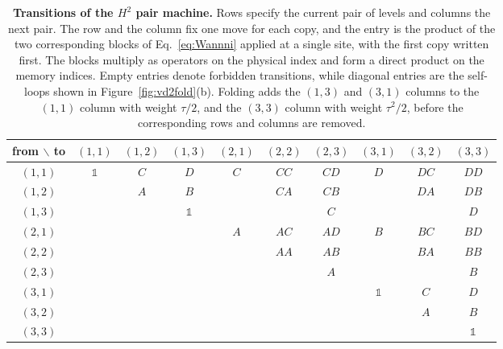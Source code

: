 \begin{table}[!htb]
  \centering
  \footnotesize
  \begin{tabular}{c|ccccccccc}
    \hline
    from $\backslash$ to & $(1,1)$      & $(1,2)$ & $(1,3)$      & $(2,1)$ & $(2,2)$ & $(2,3)$ & $(3,1)$      & $(3,2)$ & $(3,3)$      \\
    \hline
    $(1,1)$              & $\mathbb{1}$ & $C$     & $D$          & $C$     & $CC$    & $CD$    & $D$          & $DC$    & $DD$         \\
    $(1,2)$              &              & $A$     & $B$          &         & $CA$    & $CB$    &              & $DA$    & $DB$         \\
    $(1,3)$              &              &         & $\mathbb{1}$ &         &         & $C$     &              &         & $D$          \\
    $(2,1)$              &              &         &              & $A$     & $AC$    & $AD$    & $B$          & $BC$    & $BD$         \\
    $(2,2)$              &              &         &              &         & $AA$    & $AB$    &              & $BA$    & $BB$         \\
    $(2,3)$              &              &         &              &         &         & $A$     &              &         & $B$          \\
    $(3,1)$              &              &         &              &         &         &         & $\mathbb{1}$ & $C$     & $D$          \\
    $(3,2)$              &              &         &              &         &         &         &              & $A$     & $B$          \\
    $(3,3)$              &              &         &              &         &         &         &              &         & $\mathbb{1}$ \\
    \hline
  \end{tabular}
  \caption{\textbf{Transitions of the $H^2$ pair machine.} Rows specify the current pair of levels and columns the next pair. The row and the column fix one move for each copy, and the entry is the product of the two corresponding blocks of Eq.~\eqref{eq:Wannni} applied at a single site, with the first copy written first. The blocks multiply as operators on the physical index and form a direct product on the memory indices. Empty entries denote forbidden transitions, while diagonal entries are the self-loops shown in Figure~\ref{fig:vd2fold}(b). Folding adds the $(1,3)$ and $(3,1)$ columns to the $(1,1)$ column with weight $\tau/2$, and the $(3,3)$ column with weight $\tau^2/2$, before the corresponding rows and columns are removed.}
  \label{tab:vd2_transitions}
\end{table}

